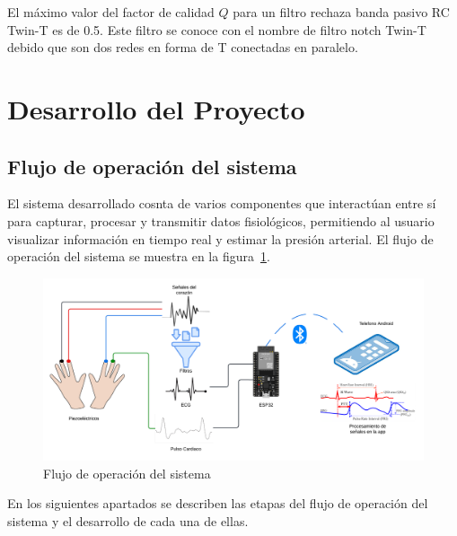            El máximo valor del factor de calidad $Q$ para un filtro rechaza banda pasivo RC Twin-T es de 0.5. Este filtro se conoce con el nombre de filtro notch Twin-T debido que son dos redes en forma de T conectadas en paralelo.
        

\newpage
\section{Desarrollo del Proyecto}
    \subsection{Flujo de operación del sistema}
    El sistema desarrollado cosnta de varios componentes que interactúan entre sí para capturar, procesar y transmitir datos fisiológicos, permitiendo al usuario visualizar información en tiempo real y estimar la presión arterial. El flujo de operación del sistema se muestra en la figura~\ref{fig:Flujo_Operacion}.

    \begin{figure}[H]
        \centering
        \includegraphics[width=1\textwidth]{img/Desarrollo/flujo_operacion.png}
        \caption[Flujo de operación del sistema.]{Flujo de operación del sistema}
        \label{fig:Flujo_Operacion}
    \end{figure}

    En los siguientes apartados se describen las etapas del flujo de operación del sistema y el desarrollo de cada una de ellas.

